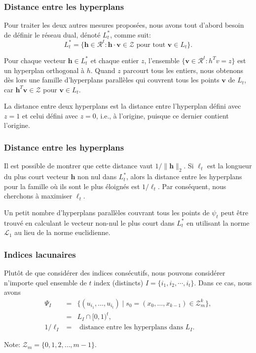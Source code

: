 \documentclass[t,usepdftitle=false]{beamer}
\def\bh{\boldsymbol{h}}
\def\bv{\boldsymbol{v}}
\def\RR{\mathcal{R}}
\def\ZZ{\mathcal{Z}}
\begin{document}
\begin{frame}
\frametitle{Distance entre les hyperplans}

Pour traiter les deux autres mesures proposées, nous avons tout
d'abord besoin de définir le réseau dual, dénoté $L_t^*$, comme suit:
\[
  L_t^* = \{\bh \in \RR^t : \bh\cdot\bv \in\mathcal{Z} \mbox{ pour tout  }\bv\in L_t\}.
\]

\mbox{}

Pour chaque vecteur $\bh \in L_t^*$ et chaque entier $z$, l'ensemble
$\lbrace \bv \in \RR^t: h^Tv = z\rbrace$ est un hyperplan
orthogonal à $h$.
Quand $z$ parcourt tous les entiers, nous obtenons dès lors une
famille d'hyperplans parallèles qui couvrent tous les points $\bv$ de
$L_t$, car $\bh^T\bv \in \ZZ$ pour $\bv \in L_t$.

\mbox{}

La distance entre deux hyperplans est la distance entre l'hyperplan
défini avec $z=1$ et celui défini avec $z = 0$, i.e., à l'origine,
puisque ce dernier contient l'origine.

\end{frame}

\begin{frame}
\frametitle{Distance entre les hyperplans}

Il est possible de montrer que cette distance vaut $1/\|\bh\|_2$.
Si ${\ell_t}$ est la longueur du plus court vecteur 
$\bh$ non nul dans $L_t^*$, alors la distance entre les hyperplans
pour la famille où ils sont le plus éloignés est $1/\ell_t$.
Par conséquent, nous cherchons à maximiser $\ell_t$.

\mbox{}

Un petit nombre d'hyperplans parallèles couvrant tous les points de
$\psi_t$ peut être trouvé en calculant le vecteur non-nul le plus
court dans $L_t^*$ en utilisant la norme $\mathcal{L}_1$ au lieu de la
norme euclidienne.

\end{frame}

\begin{frame}
\frametitle{Indices lacunaires}

Plutôt de que considérer des indices consécutifs, nous pouvons
considérer n'importe quel ensemble de $t$ index (distincts) ${I} = \{i_1,
i_2, \cdots, i_t\}$. Dans ce cas, nous avons
\begin {eqnarray*}
  {\Psi_I} 
   &=& \{ (u_{i_1},\dots,u_{i_t}) \mid 
              s_0 = (x_0,\dots,x_{k-1}) \in \mathcal{Z}_m^k\},\\
   &=& {L_I} \cap [0,1)^t, \\
  1/{\ell_I} &=& \mbox { distance entre les hyperplans dans $L_I$.}
\end {eqnarray*}

\mbox{}

Note: $\mathcal{Z}_m = \lbrace 0, 1, 2, \ldots, m-1 \rbrace$.

\end{frame}
\end{document}
